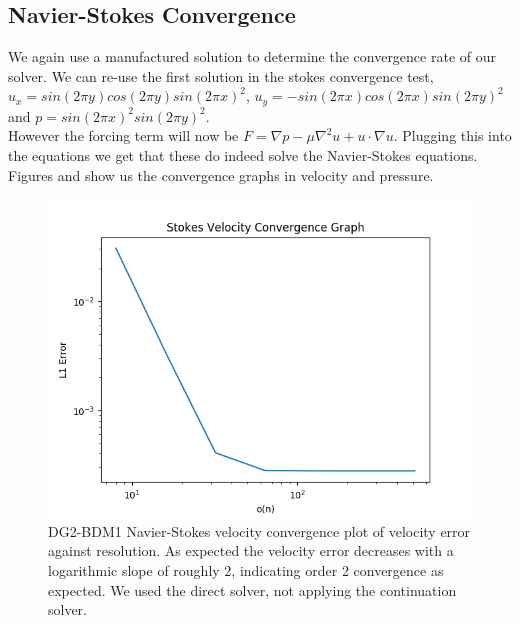 \documentclass[11pt,twoside,a4paper]{article}
\begin{document}
\subsection{Navier-Stokes Convergence}

We again use a manufactured solution to determine the convergence rate of our solver.
We can re-use the first solution in the stokes convergence test, $u_x = sin(2 \pi y) cos(2 \pi y)sin(2 \pi x)^2$, $u_y= -sin(2 \pi x) cos(2 \pi x) sin(2 \pi y)^2$ and $p = sin(2 \pi x)^2 sin(2 \pi y)^2$.\\
However the forcing term will now be $F = \nabla p - \mu \nabla^2 u + u \cdot \nabla u$.
Plugging this into the equations we get that these do indeed solve the Navier-Stokes equations.\\
Figures and show us the convergence graphs in velocity and pressure.\\

\begin{figure}
  \includegraphics[width=\linewidth]{navier_stokes_convergence_dbc0.png}
  \caption{DG2-BDM1 Navier-Stokes velocity convergence plot of velocity error against resolution. As expected the velocity error decreases with a logarithmic slope of roughly 2, indicating order 2 convergence as expected. We used the direct solver, not applying the continuation solver.}
\end{figure}
\end{document}
